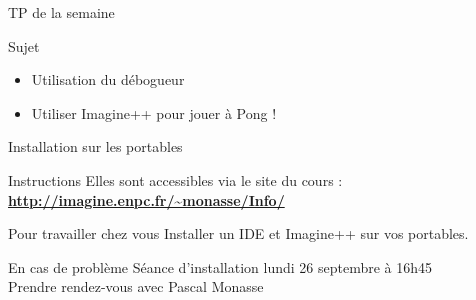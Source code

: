 \begin{frame}{TP de la semaine}

	\begin{block}{Sujet}
        \begin{itemize}
            \item Utilisation du débogueur
            \item Utiliser Imagine++ pour jouer à Pong !
        \end{itemize}
	\end{block}

\end{frame}


\begin{frame}{Installation sur les portables}

	\begin{block}{Instructions}
		Elles sont accessibles via le site du cours :\\
		\textbf{\url{http://imagine.enpc.fr/~monasse/Info/}}
	\end{block}

	\begin{block}{Pour travailler chez vous}
		Installer un IDE et Imagine++ sur vos portables.
	\end{block}
	
	\begin{alertblock}{En cas de problème}
		Séance d'installation lundi 26 septembre à 16h45 \\
		Prendre rendez-vous avec Pascal Monasse
	\end{alertblock}

\end{frame}


